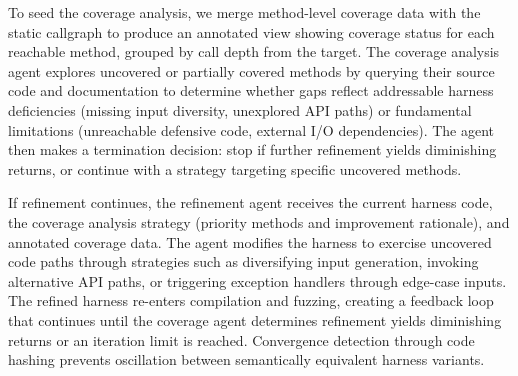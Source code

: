 To seed the coverage analysis, we merge method-level coverage data with the static callgraph to produce an annotated view showing coverage status for each reachable method, grouped by call depth from the target. The coverage analysis agent explores uncovered or partially covered methods by querying their source code and documentation to determine whether gaps reflect addressable harness deficiencies (missing input diversity, unexplored API paths) or fundamental limitations (unreachable defensive code, external I/O dependencies). The agent then makes a termination decision: stop if further refinement yields diminishing returns, or continue with a strategy targeting specific uncovered methods.

If refinement continues, the refinement agent receives the current harness code, the coverage analysis strategy (priority methods and improvement rationale), and annotated coverage data. The agent modifies the harness to exercise uncovered code paths through strategies such as diversifying input generation, invoking alternative API paths, or triggering exception handlers through edge-case inputs. The refined harness re-enters compilation and fuzzing, creating a feedback loop that continues until the coverage agent determines refinement yields diminishing returns or an iteration limit is reached. Convergence detection through code hashing prevents oscillation between semantically equivalent harness variants.
